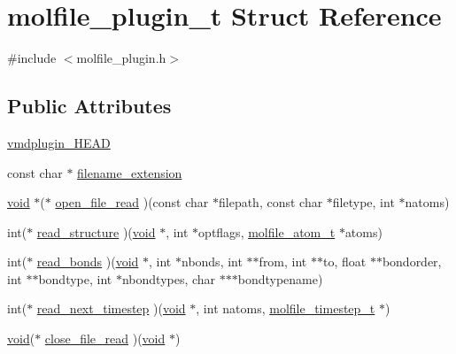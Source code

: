\hypertarget{structmolfile__plugin__t}{\section{molfile\-\_\-plugin\-\_\-t \-Struct \-Reference}
\label{structmolfile__plugin__t}
}


{\ttfamily \#include $<$molfile\-\_\-plugin.\-h$>$}

\subsection*{\-Public \-Attributes}
\begin{DoxyCompactItemize}
\item 
\hyperlink{structmolfile__plugin__t_a0aad2280e74ace06633058e3501a340b}{vmdplugin\-\_\-\-H\-E\-A\-D}
\item 
const char $\ast$ \hyperlink{structmolfile__plugin__t_a707dd1b313dd9c8ec4f344038ef78708}{filename\-\_\-extension}
\item 
\hyperlink{nbnxn__kernel__simd__4xn__outer_8h_a8dc3f4a797ed992dff49d2fa3477eee8}{void} $\ast$($\ast$ \hyperlink{structmolfile__plugin__t_a992bbcd14769aee84a652307eb864ce2}{open\-\_\-file\-\_\-read} )(const char $\ast$filepath, const char $\ast$filetype, int $\ast$natoms)
\item 
int($\ast$ \hyperlink{structmolfile__plugin__t_af05a7c088226fc0ecc3fe3feca347754}{read\-\_\-structure} )(\hyperlink{nbnxn__kernel__simd__4xn__outer_8h_a8dc3f4a797ed992dff49d2fa3477eee8}{void} $\ast$, int $\ast$optflags, \hyperlink{structmolfile__atom__t}{molfile\-\_\-atom\-\_\-t} $\ast$atoms)
\item 
int($\ast$ \hyperlink{structmolfile__plugin__t_a6e1aca38d75aacb2cbcf6401261cdb5f}{read\-\_\-bonds} )(\hyperlink{nbnxn__kernel__simd__4xn__outer_8h_a8dc3f4a797ed992dff49d2fa3477eee8}{void} $\ast$, int $\ast$nbonds, int $\ast$$\ast$from, int $\ast$$\ast$to, float $\ast$$\ast$bondorder, int $\ast$$\ast$bondtype, int $\ast$nbondtypes, char $\ast$$\ast$$\ast$bondtypename)
\item 
int($\ast$ \hyperlink{structmolfile__plugin__t_a236f89950634743ee58330622407f255}{read\-\_\-next\-\_\-timestep} )(\hyperlink{nbnxn__kernel__simd__4xn__outer_8h_a8dc3f4a797ed992dff49d2fa3477eee8}{void} $\ast$, int natoms, \hyperlink{structmolfile__timestep__t}{molfile\-\_\-timestep\-\_\-t} $\ast$)
\item 
\hyperlink{nbnxn__kernel__simd__4xn__outer_8h_a8dc3f4a797ed992dff49d2fa3477eee8}{void}($\ast$ \hyperlink{structmolfile__plugin__t_a2fbc2c1623f4453c8bd95548e6c5de53}{close\-\_\-file\-\_\-read} )(\hyperlink{nbnxn__kernel__simd__4xn__outer_8h_a8dc3f4a797ed992dff49d2fa3477eee8}{void} $\ast$)

\end{DoxyCompactItemize}
